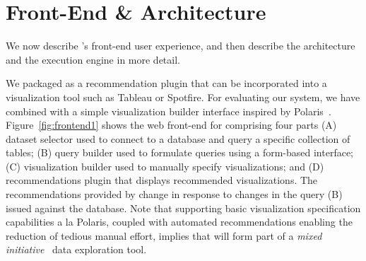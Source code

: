 
\section{{\large \SeeDB} Front-End \& Architecture}
\label{sec:system_architecture}


We now describe \SeeDB's front-end user experience, and then
describe the architecture and the execution engine in more detail.

We packaged \SeeDB as a recommendation plugin that can
be incorporated into a visualization tool such as Tableau or Spotfire. 
For evaluating our system, we have combined \SeeDB with a simple visualization
builder interface inspired by Polaris~\cite{polaris}.
Figure~\ref{fig:frontend1} shows the web front-end for \SeeDB 
comprising four parts 
(A) dataset selector used to connect to a database and query a specific collection of tables; 
(B) query builder used to
formulate queries using a form-based interface; 
(C) visualization builder used to manually specify visualizations; and 
(D) \SeeDB recommendations plugin 
that displays recommended visualizations.
The recommendations provided by \SeeDB change in 
response to changes in the query (B)
issued against the database.
Note that supporting basic visualization specification 
capabilities a la Polaris, coupled with automated recommendations enabling
the reduction of tedious manual effort,
implies that \SeeDB will form part of a
{\em mixed initiative}~\cite{mixed_initiative} data exploration tool.


